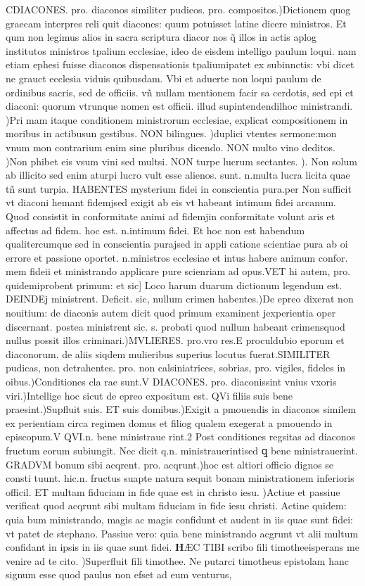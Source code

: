 \documentclass{article}
\begin{document}
\begin{pages}
\pend\pstart CDIACONES. pro. diaconos similiter pudicos. pro. compositos.)Dictionem quog graecam interpres reli quit diacones: quum potuisset latine dicere ministros. Et qum non legimus alios in sacra scriptura diacor nos q̃ illos in actis aplog institutos ministros tpalium ecclesiae, ideo de eisdem intelligo paulum loqui. nam etiam ephesi fuisse diaconos dispensationis tpaliumipatet ex subinnctis: vbi dicet ne grauct ecclesia viduis quibusdam. Vbi et aduerte non loqui paulum de ordinibus sacris, sed de officiis. vñ nullam mentionem facir sa cerdotis, sed epi et diaconi: quorum vtrunque nomen est officii. illud supintendendilhoc ministrandi. )Pri mam itaque conditionem ministrorum ecclesiae, explicat compositionem in moribus in actibusun gestibus. NON bilingues. )duplici vtentes sermone:mon vnum mon contrarium enim sine pluribus dicendo. NON multo vino deditos. )Non phibet eis vsum vini sed multsi. NON turpe lucrum sectantes. ). Non solum ab illicito sed enim aturpi lucro vult esse alienos. sunt. n.multa lucra licita quae tñ sunt turpia. HABENTES mysterium fidei in conscientia pura.per Non sufficit vt diaconi hemant fidemjsed exigit ab eis vt habeant intimum fidei arcanum. Quod consistit in conformitate animi ad fidemjin conformitate volunt aris et affectus ad fidem. hoc est. n.intimum fidei. Et hoc non est habendum qualitercumque sed in conscientia purajsed in appli catione scientiae pura ab oi errore et passione oportet. n.ministros ecclesiae et intus habere animum confor. mem fideii et ministrando applicare pure scienriam ad opus.VET hi autem, pro. quidemiprobent primum: et sic] Loco harum duarum dictionum legendum est. DEINDEj ministrent. Deficit. sic, nullum crimen habentes.)De epreo dixerat non nouitium: de diaconis autem dicit quod primum examinent jexperientia oper discernant. postea ministrent sic. s. probati quod nullum habeant crimensquod nullus possit illos criminari.)MVLIERES. pro.vro res.E proculdubio eporum et diaconorum. de aliis siqdem mulieribus superius locutus fuerat.SIMILITER pudicas, non detrahentes. pro. non calsiniatrices, sobrias, pro. vigiles, fideles in oibus.)Conditiones cla rae sunt.V DIACONES. pro. diaconissint vnius vxoris viri.)Intellige hoc sicut de epreo expositum est. QVi filiis suis bene praesint.)Supfluit suis. ET suis domibus.)Exigit a pmouendis in diaconos similem ex perientiam circa regimen domus et filiog qualem exegerat a pmouendo in episcopum.V QVI.n. bene ministraue rint.2 Post conditiones regsitas ad diaconos fructum eorum subiungit. Nec dicit q.n. ministrauerintised ꝗ bene ministrauerint. GRADVM bonum sibi acqrent. pro. acqrunt.)hoc est altiori officio dignos se consti tuunt. hic.n. fructus suapte natura sequit bonam ministrationem inferioris officil. ET multam fiduciam in fide quae est in christo iesu. )Actiue et passiue verificat quod acqrunt sibi multam fiduciam in fide iesu christi. Actine quidem: quia bum ministrando, magis ac magis confidunt et audent in iis quae sunt fidei: vt patet de stephano. Passiue vero: quia bene ministrando acgrunt vt alii multum confidant in ipsis in iis quae sunt fidei.  \pend\pstart \huge\textbf{H}\normalsize ÆC TIBI scribo fili timotheeisperans me venire ad te cito. )Superfluit fili timothee. Ne putarci timotheus epistolam hanc signum esse quod paulus non efset ad eum venturus, 
\end{pages}
\end{document}
